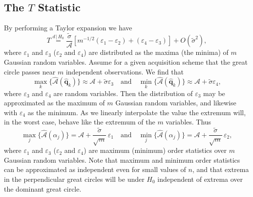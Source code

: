 \documentclass[dvips,aoas,preprint]{imsart}
\numberwithin{equation}{section}
\theoremstyle{plain}
\newcommand{\q}{\mathbf{q}}
\newcommand{\cA}{\mathcal{A}}
\newcommand{\vare}{\varepsilon}
\newcommand{\wh}[1]{\widehat{#1}}
\begin{document}
\subsection{The $T$ Statistic}
\label{disttm}

By performing a Taylor expansion we have 
\begin{equation}
  T \stackrel{d\,|\,H_0}{=} \frac{\tilde\sigma}{\cA} \left[m^{-1/2}(\vare_1-\vare_2) + (\vare_4-\vare_3)\right] + O\left(\tilde\sigma^2\right),
\end{equation}
where $\vare_1$ and $\vare_3$ ($\vare_2$ and $\vare_4$) are
distributed as the maxima (the minima) of $m$ Gaussian random
variables.  Assume for a given acquisition scheme that the great
circle passes near $m$ independent observations.  We find that
\begin{equation}
  \max_k\{\wh\cA\left(\hat{\q}_k\right)\} \approx \cA + \tilde\sigma
\vare_3 \quad \text{and} \quad  \min_k\{\wh\cA\left(\hat{\q}_{k}\right)\} \approx \cA + \tilde\sigma\vare_4,
\end{equation}
where $\vare_3$ and $\vare_4$ are random variables.  Then the
distribution of $\vare_3$ may be approximated as the maximum of $m$
Gaussian random variables, and likewise with $\vare_4$ as the minimum.
As we linearly interpolate the value the extremum will, in the worst
case, behave like the extremum of the $m$ variables.  Thus
\begin{equation}\label{e:Taylor2}
  \max_j\{{\wh\cA}\left(\alpha_{j}\right)\} = \cA +
  \frac{\tilde\sigma}{\sqrt{m}} \, \vare_1 \quad \text{and} \quad
  \min_j\{{\wh\cA}\left(\alpha_{j}\right)\} = \cA +
  \frac{\tilde\sigma}{\sqrt{m}} \, \vare_2,
\end{equation}
where $\vare_1$ and $\vare_3$ ($\vare_2$ and $\vare_4$) are maximum
(minimum) order statistics over $m$ Gaussian random variables.  Note
that maximum and minimum order statistics \citep{Walsh1970} can be
approximated as independent even for small values of $n$, and that
extrema in the perpendicular great circles will be under $H_0$
independent of extrema over the dominant great circle.
\end{document}
